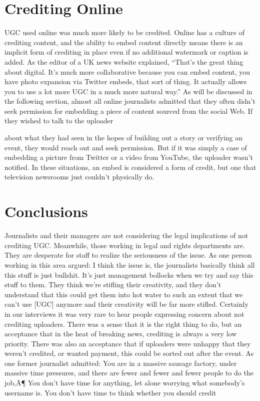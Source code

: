 \documentclass[symmetric, notoc, nobib]{towcenter-book}
\begin{document}
\section{Crediting Online}
UGC used online was much more likely to be credited. Online has a culture
of crediting content, and the ability to embed content directly means there
is an implicit form of crediting in place even if no additional watermark or
caption is added.
As the editor of a UK news website explained, ``That's the great thing about
digital. It's much more collaborative because you can embed content, you
have photo expansion via Twitter embeds, that sort of thing. It actually
allows you to use a lot more UGC in a much more natural way.''
As will be discussed in the following section, almost all online journalists
admitted that they often didn't seek permission for embedding a piece of
content sourced from the social Web. If they wished to talk to the uploader

about what they had seen in the hopes of building out a story or verifying an
event, they would reach out and seek permission. But if it was simply a case
of embedding a picture from Twitter or a video from YouTube, the uploader
wasn't notified. In these situations, an embed is considered a form of credit,
but one that television newsrooms just couldn't physically do.
\section{Conclusions}
Journalists and their managers are not considering the legal implications of
not crediting UGC. Meanwhile, those working in legal and rights departments
are. They are desperate for staff to realize the seriousness of the issue.
As one person working in this area argued:
I think the issue is, the journalists basically think all this stuff is just
bullshit. It's just management bollocks when we try and say this stuff
to them. They think we're stifling their creativity, and they don't
understand that this could get them into hot water to such an extent
that we can't use [UGC] anymore and their creativity will be far
more stifled.
Certainly in our interviews it was very rare to hear people expressing concern
about not crediting uploaders. There was a sense that it is the right
thing to do, but an acceptance that in the heat of breaking news, crediting
is always a very low priority. There was also an acceptance that if uploaders
were unhappy that they weren't credited, or wanted payment, this could be
sorted out after the event. As one former journalist admitted:
You are in a massive sausage factory, under massive time pressures,
and there are fewer and fewer and fewer people to do the job‚Ä¶ You
don't have time for anything, let alone worrying what somebody's
username is. You don't have time to think whether you should credit
\end{document}
